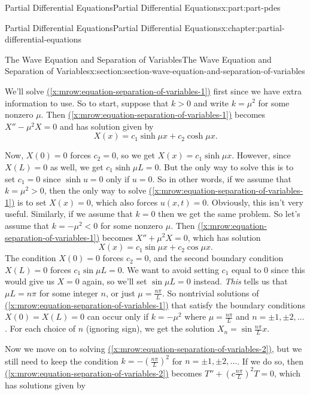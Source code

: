 \documentclass[twoside,10pt,]{book}
\newcommand{\xreffont}{\relax}
\numberwithin{equation}{part}
\newcommand{\lt}{<}
\newcommand{\gt}{>}
\begin{document}
\begin{partptx}{Partial Differential Equations}{}{Partial Differential Equations}{}{}{x:part:part-pdes}
\begin{chapterptx}{Partial Differential Equations}{}{Partial Differential Equations}{}{}{x:chapter:partial-differential-equations}
\begin{sectionptx}{The Wave Equation and Separation of Variables}{}{The Wave Equation and Separation of Variables}{}{}{x:section:section-wave-equation-and-separation-of-variables}
\par
We'll solve \hyperref[x:mrow:equation-separation-of-variables-1]{({\xreffont\ref{x:mrow:equation-separation-of-variables-1}})} first since we have extra information to use. So to start, suppose that \(k>0\) and write \(k = \mu^{2}\) for some nonzero \(\mu\). Then \hyperref[x:mrow:equation-separation-of-variables-1]{({\xreffont\ref{x:mrow:equation-separation-of-variables-1}})} becomes \(X''-\mu^{2}X = 0\) and has solution given by%
\begin{equation*}
X(x) = c_{1}\sinh\mu x + c_{2}\cosh \mu x.
\end{equation*}
%
\par
Now, \(X(0)=0\) forces \(c_{2} = 0\), so we get \(X(x) = c_{1}\sinh\mu x\). However, since \(X(L) = 0\) as well, we get \(c_{1}\sinh\mu L = 0\). But the only way to solve this is to set \(c_{1} = 0\) since \(\sinh u = 0\) only if \(u=0\). So in other words, if we assume that \(k = \mu^{2}\gt0\), then the only way to solve \hyperref[x:mrow:equation-separation-of-variables-1]{({\xreffont\ref{x:mrow:equation-separation-of-variables-1}})} is to set \(X(x) = 0\), which also forces \(u(x,t) = 0\). Obviously, this isn't very useful. Similarly, if we assume that \(k=0\) then we get the same problem. So let's assume that \(k=-\mu^{2}\lt0\) for some nonzero \(\mu\). Then \hyperref[x:mrow:equation-separation-of-variables-1]{({\xreffont\ref{x:mrow:equation-separation-of-variables-1}})} becomes \(X''+\mu^{2}X = 0\), which has solution%
%
\begin{equation*}
X(x) = c_{1}\sin\mu x + c_{2}\cos \mu x.
\end{equation*}
The condition \(X(0) = 0\) forces \(c_{2} = 0\), and the second boundary condition \(X(L) = 0\) forces \(c_{1}\sin \mu L = 0\). We want to avoid setting \(c_{1}\) equal to \(0\) since this would give us \(X=0\) again, so we'll set \(\sin \mu L= 0\) instead. \emph{This} tells us that \(\mu L = n\pi\) for some integer \(n\), or just \(\mu = \frac{n\pi}{L}\). So nontrivial solutions of \hyperref[x:mrow:equation-separation-of-variables-1]{({\xreffont\ref{x:mrow:equation-separation-of-variables-1}})} that satisfy the boundary conditions \(X(0)=X(L) = 0\) can occur only if \(k = -\mu^{2}\) where \(\mu = \frac{n\pi}{L}\) and \(n=\pm1,\pm2,\ldots\). For each choice of \(n\) (ignoring sign), we get the solution \(X_{n} = \sin\frac{n\pi}{L}x\).%
\par
Now we move on to solving \hyperref[x:mrow:equation-separation-of-variables-2]{({\xreffont\ref{x:mrow:equation-separation-of-variables-2}})}, but we still need to keep the condition \(k=-(\frac{n\pi}{L})^{2}\) for \(n=\pm1,\pm2,\ldots\). If we do so, then \hyperref[x:mrow:equation-separation-of-variables-2]{({\xreffont\ref{x:mrow:equation-separation-of-variables-2}})} becomes \(T''+(c\frac{n\pi}{L})^{2}T=0\), which has solutions given by%

\end{sectionptx}
\end{chapterptx}
\end{partptx}
\end{document}
